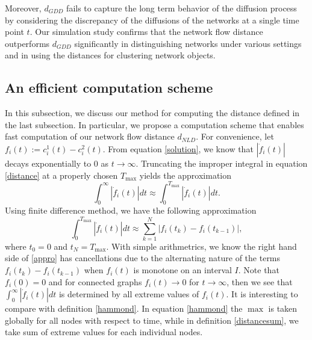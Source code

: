 \documentclass{amsart}
\begin{document}
Moreover, $d_{GDD}$  fails to capture the long term behavior of the diffusion process by considering the discrepancy of the diffusions of the networks at a single time point $t$.  Our simulation study confirms that the network flow distance outperforms $d_{GDD}$ significantly in distinguishing networks under various settings and in using the distances for clustering network objects. 


\subsection{An efficient computation scheme}

In this subsection, we discuss our method for computing the  distance defined in the last subsection. In particular, we propose a computation scheme that enables fast computation of our network flow distance $d_{NLD}$. 
For convenience, let $f_i(t):=c^1_i(t)-c_i^2(t)$. From equation \eqref{solution}, we know that $|\dot{f}_i(t)|$ decays exponentially to $0$ as $t\rightarrow\infty$. Truncating the improper integral in equation \eqref{distance} at a properly chosen $T_{\max}$ yields the approximation
\begin{equation}
\int_{0}^{\infty}|\dot{f}_i(t)|dt\approx\int_{0}^{T_{\max}}|\dot{f}_i(t)|dt.
\end{equation}
Using finite difference method, we have the following approximation
\begin{equation}\label{appro}
\int_{0}^{T_{\max}}|\dot{f}_i(t)|dt\approx\sum_{k=1}^{N}|f_i(t_k)-f_i(t_{k-1})|,
\end{equation}
where $t_0=0$ and $t_N=T_{\max}$.
With simple arithmetrics, we know the right hand side of \eqref{appro} has cancellations due to the alternating nature of the terms $f_i(t_k)-f_i(t_{k-1})$ when $f_i(t)$ is monotone on an interval $I$. Note that $f_i(0)=0$ and for connected graphs $f_i(t)\rightarrow 0$ for $t\rightarrow \infty$, then we see that $\int_{0}^{\infty}|\dot{f}_i(t)|dt$ is determined by all extreme values of $f_i(t)$. It is interesting to compare with definition \eqref{hammond}. In equation \eqref{hammond} the $\max$ is taken globally for all nodes with respect to time, while in definition \eqref{distancesum}, we take sum of extreme values for each individual nodes. 
\end{document}
